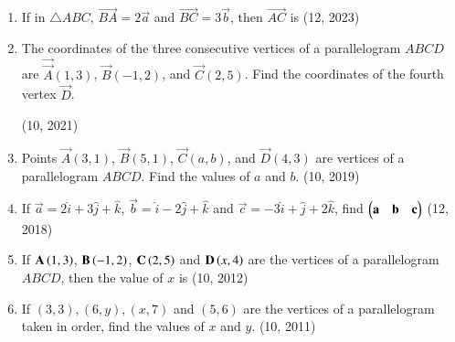 \begin{enumerate}[label=\thesubsection.\arabic*, ref=\thesubsection.\theenumi]
    \item If in $\triangle ABC$, $\overrightarrow{BA} = 2\vec{a}$ and $\overrightarrow{BC} = 3\vec{b}$, then $\overrightarrow{AC}$ is
    \hfill (12, 2023)
	\item The coordinates of the three consecutive vertices of a parallelogram $ABCD$ are $\vec{\vec{A}}(1, 3)$, $\vec{B}(-1, 2)$, and $\vec{C}(2, 5)$. Find the coordinates of the fourth vertex $\vec{D}$. 

		\hfill (10, 2021)
\item Points $\vec{A}(3, 1)$, $\vec{B}(5, 1)$, $\vec{C}(a, b)$, and $\vec{D}(4, 3)$ are vertices of a parallelogram $ABCD$. Find the values of $a$ and $b$. \hfill (10, 2019)
\item If $\vec{a}=2\hat{i}+3\hat{j}+\hat{k}$, $\vec{b}=\hat{i}-2\hat{j}+\hat{k}$ and $\vec{c}=-3\hat{i}+\hat{j}+2\hat{k}$, find $\begin{pmatrix}\mathbf{a}&\mathbf{b}&\mathbf{c} \end{pmatrix}$
\hfill (12, 2018) 
\item If $\mathbf{A}\left(1,3\right)$, $\mathbf{B}\left(-1,2\right)$, $\mathbf{C}\left(2,5\right)$ and $\mathbf{D}\left(x,4\right)$ are the vertices of a parallelogram $ABCD$, then the value of $x$ is
\hfill (10, 2012)
    \item If $(3,3),(6,y),(x,7)$ and $(5,6)$ are the vertices of a parallelogram taken in order, find the values of $x$ and $y$.
\hfill (10, 2011)
	
\end{enumerate}
